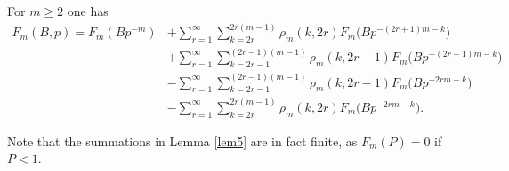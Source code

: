 \begin{lemma}\label{lem5}
For $m\geq 2$ one has
\begin{equation*}
\begin{split}
F_m(B,p) = F_m(Bp^{-m}) &+\sum_{r=1}^{\infty} \sum_{k=2r}^{2r(m-1)}\rho_m(k,2r)F_m\bigl(Bp^{-(2r+1)m-k}\bigr)\\
&+ \sum_{r=1}^\infty\sum_{k=2r-1}^{(2r-1)(m-1)}\rho_m(k,2r-1)F_m\bigl(Bp^{-(2r-1)m-k}\bigr)\\
&-\sum_{r=1}^\infty \sum_{k=2r-1}^{(2r-1)(m-1)}\rho_m(k,2r-1)F_m\bigl(Bp^{-2rm-k}\bigr)\\
&-\sum_{r=1}^\infty\sum_{k=2r}^{2r(m-1)}\rho_m(k,2r)F_m\bigl(Bp^{-2rm-k}\bigr).
\end{split}
\end{equation*}

\end{lemma}

Note that the summations in Lemma \ref{lem5} are in fact finite, as $F_m(P)=0$ if $P<1$.

